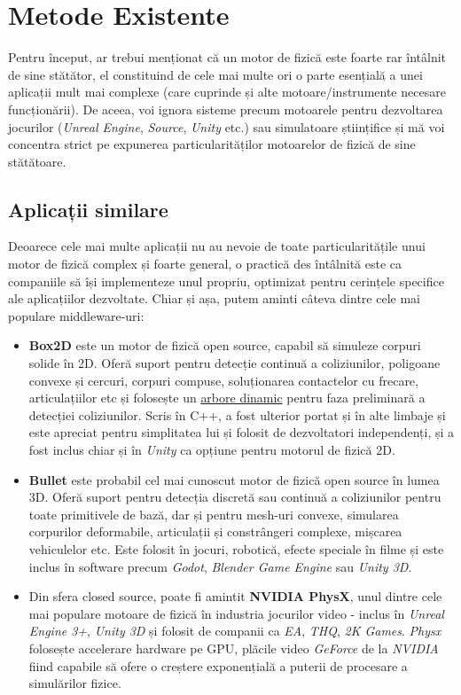 \documentclass[12pt,a4paper]{report}
\begin{document}
\chapter{Metode Existente}
Pentru început, ar trebui menționat că un motor de fizică este foarte rar întâlnit de sine stătător, el constituind de cele mai multe ori o parte esențială a unei aplicații mult mai complexe (care cuprinde și alte motoare/instrumente necesare funcționării). De aceea, voi ignora sisteme precum motoarele pentru dezvoltarea jocurilor (\textit{Unreal Engine}\cite{unreal}, \textit{Source}\cite{source}, \textit{Unity}\cite{unity} etc.) sau simulatoare științifice și mă voi concentra strict pe expunerea particularităților motoarelor de fizică de sine stătătoare.
\section{Aplicații similare}
Deoarece cele mai multe aplicații nu au nevoie de toate particularitățile unui motor de fizică complex și foarte general, o practică des întâlnită este ca companiile să își implementeze unul propriu, optimizat pentru cerințele specifice ale aplicațiilor dezvoltate. Chiar și așa, putem aminti câteva dintre cele mai populare middleware-uri: 
\begin{itemize}
	\item \textbf{Box2D}\cite{box2D} este un motor de fizică open source, capabil să simuleze corpuri solide în 2D. Oferă suport pentru detecție continuă a coliziunilor, poligoane convexe și cercuri, corpuri compuse, soluționarea contactelor cu frecare, articulațiilor etc și folosește un \hyperref[BVH]{arbore dinamic} pentru faza preliminară a detecției coliziunilor. Scris în C++, a fost ulterior portat și în alte limbaje și este apreciat pentru simplitatea lui și folosit de dezvoltatori independenți, și a fost inclus chiar și în \textit{Unity}\cite{unity} ca opțiune pentru motorul de fizică 2D.
	\item \textbf{Bullet}\cite{bullet} este probabil cel mai cunoscut motor de fizică open source în lumea 3D. Oferă suport pentru detecția discretă sau continuă a coliziunilor pentru toate primitivele de bază, dar și pentru mesh-uri convexe, simularea corpurilor deformabile, articulații și constrângeri complexe, mișcarea vehiculelor etc. Este folosit în jocuri, robotică, efecte speciale în filme și este inclus în software precum \textit{Godot}\cite{godot}, \textit{Blender Game Engine}\cite{blender} sau \textit{Unity 3D}\cite{unity}.
	\item Din sfera closed source, poate fi amintit \textbf{NVIDIA PhysX}\cite{physx}, unul dintre cele mai populare motoare de fizică în industria jocurilor video - inclus în \textit{Unreal Engine 3+}\cite{unreal}, \textit{Unity 3D}\cite{unity} și folosit de companii ca \textit{EA}, \textit{THQ}, \textit{2K Games}. \textit{Physx} folosește accelerare hardware pe GPU, plăcile video \textit{GeForce} de la \textit{NVIDIA} fiind capabile să ofere o creștere exponențială a puterii de procesare a simulărilor fizice.  
\end{itemize}
\end{document}
